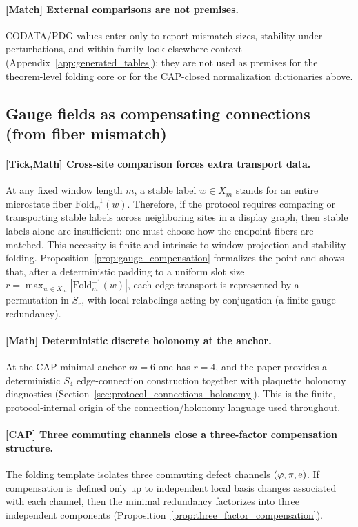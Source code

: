 \paragraph{[Match] External comparisons are not premises.}
CODATA/PDG values enter only to report mismatch sizes, stability under perturbations, and within-family look-elsewhere context (Appendix~\ref{app:generated_tables}); they are not used as premises for the theorem-level folding core or for the CAP-closed normalization dictionaries above.

\subsection{Gauge fields as compensating connections (from fiber mismatch)}
\label{subsec:tick_cap_gauge}

\paragraph{[Tick,\;Math] Cross-site comparison forces extra transport data.}
At any fixed window length $m$, a stable label $w\in X_m$ stands for an entire microstate fiber $\mathrm{Fold}_m^{-1}(w)$.
Therefore, if the protocol requires comparing or transporting stable labels across neighboring sites in a display graph, then stable labels alone are insufficient: one must choose how the endpoint fibers are matched.
This necessity is finite and intrinsic to window projection and stability folding.
Proposition~\ref{prop:gauge_compensation} formalizes the point and shows that, after a deterministic padding to a uniform slot size $r=\max_{w\in X_m}|\mathrm{Fold}_m^{-1}(w)|$, each edge transport is represented by a permutation in $S_r$, with local relabelings acting by conjugation (a finite gauge redundancy).

\paragraph{[Math] Deterministic discrete holonomy at the anchor.}
At the CAP-minimal anchor $m=6$ one has $r=4$, and the paper provides a deterministic $S_4$ edge-connection construction together with plaquette holonomy diagnostics (Section~\ref{sec:protocol_connections_holonomy}).
This is the finite, protocol-internal origin of the connection/holonomy language used throughout.

\paragraph{[CAP] Three commuting channels close a three-factor compensation structure.}
The folding template isolates three commuting defect channels $(\varphi,\pi,\mathrm{e})$.
If compensation is defined only up to independent local basis changes associated with each channel, then the minimal redundancy factorizes into three independent components (Proposition~\ref{prop:three_factor_compensation}).

